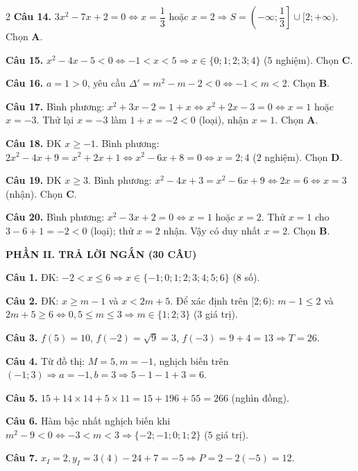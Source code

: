 \documentclass[12pt,a4paper]{article}
\begin{document}
\begin{multicols}{2}
\textbf{Câu 14.} $3x^2 - 7x + 2 = 0 \Leftrightarrow x = \dfrac{1}{3}$ hoặc $x = 2 \Rightarrow S = \left(-\infty; \dfrac{1}{3}\right] \cup [2; +\infty)$. Chọn \textbf{A}.

\textbf{Câu 15.} $x^2 - 4x - 5 < 0 \Leftrightarrow -1 < x < 5 \Rightarrow x \in \{0; 1; 2; 3; 4\}$ ($5$ nghiệm). Chọn \textbf{C}.

\textbf{Câu 16.} $a = 1 > 0$, yêu cầu $\Delta' = m^2 - m - 2 < 0 \Leftrightarrow -1 < m < 2$. Chọn \textbf{B}.

\textbf{Câu 17.} Bình phương: $x^2 + 3x - 2 = 1 + x \Leftrightarrow x^2 + 2x - 3 = 0 \Leftrightarrow x = 1$ hoặc $x = -3$. Thử lại $x = -3$ làm $1 + x = -2 < 0$ (loại), nhận $x = 1$. Chọn \textbf{A}.

\textbf{Câu 18.} ĐK $x \ge -1$. Bình phương: $2x^2 - 4x + 9 = x^2 + 2x + 1 \Leftrightarrow x^2 - 6x + 8 = 0 \Leftrightarrow x = 2; 4$ ($2$ nghiệm). Chọn \textbf{D}.

\textbf{Câu 19.} ĐK $x \ge 3$. Bình phương: $x^2 - 4x + 3 = x^2 - 6x + 9 \Leftrightarrow 2x = 6 \Leftrightarrow x = 3$ (nhận). Chọn \textbf{C}.

\textbf{Câu 20.} Bình phương: $x^2 - 3x + 2 = 0 \Leftrightarrow x = 1$ hoặc $x = 2$. Thử $x = 1$ cho $3 - 6 + 1 = -2 < 0$ (loại); thử $x = 2$ nhận. Vậy có duy nhất $x = 2$. Chọn \textbf{B}.

\columnbreak

\textbf{\color{accent}PHẦN II. TRẢ LỜI NGẮN (30 CÂU)}

\textbf{Câu 1.} ĐK: $-2 < x \le 6 \Rightarrow x \in \{-1; 0; 1; 2; 3; 4; 5; 6\}$ ($8$ số).

\textbf{Câu 2.} ĐK: $x \ge m - 1$ và $x < 2m + 5$. Để xác định trên $[2; 6)$: $m - 1 \le 2$ và $2m + 5 \ge 6 \Leftrightarrow 0{,}5 \le m \le 3 \Rightarrow m \in \{1; 2; 3\}$ ($3$ giá trị).

\textbf{Câu 3.} $f(5) = 10$, $f(-2) = \sqrt{9} = 3$, $f(-3) = 9 + 4 = 13 \Rightarrow T = 26$.

\textbf{Câu 4.} Từ đồ thị: $M = 5, m = -1$, nghịch biến trên $(-1; 3) \Rightarrow a = -1, b = 3 \Rightarrow 5 - 1 - 1 + 3 = 6$.

\textbf{Câu 5.} $15 + 14 \times 14 + 5 \times 11 = 15 + 196 + 55 = 266$ (nghìn đồng).

\textbf{Câu 6.} Hàm bậc nhất nghịch biến khi $m^2 - 9 < 0 \Leftrightarrow -3 < m < 3 \Rightarrow \{-2; -1; 0; 1; 2\}$ ($5$ giá trị).

\textbf{Câu 7.} $x_I = 2, y_I = 3(4) - 24 + 7 = -5 \Rightarrow P = 2 - 2(-5) = 12$.


\end{multicols}
\end{document}
